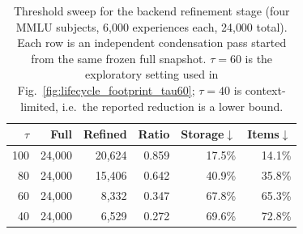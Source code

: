 \begin{table}[t]
\centering
\caption{Threshold sweep for the backend refinement stage (four MMLU subjects, 6{,}000 experiences each, 24{,}000 total). Each row is an independent condensation pass started from the same frozen full snapshot. $\tau=60$ is the exploratory setting used in Fig.~\ref{fig:lifecycle_footprint_tau60}; $\tau=40$ is context-limited, i.e.\ the reported reduction is a lower bound.}
\label{tab:refinement_sweep}
\small
\begin{tabular}{rrrrrr}
\toprule
$\tau$ & Full & Refined & Ratio & Storage$\downarrow$ & Items$\downarrow$ \\
\midrule
100 & 24,000 & 20,624 & 0.859 & 17.5\% & 14.1\% \\
80 & 24,000 & 15,406 & 0.642 & 40.9\% & 35.8\% \\
60 & 24,000 & 8,332 & 0.347 & 67.8\% & 65.3\% \\
40 & 24,000 & 6,529 & 0.272 & 69.6\% & 72.8\% \\
\bottomrule
\end{tabular}
\end{table}
